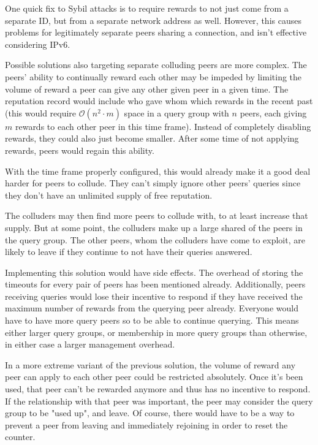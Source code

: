 One quick fix to Sybil attacks is to require rewards to not just come from a
separate ID, but from a separate network address as well. However, this causes
problems for legitimately separate peers sharing a connection, and isn't
effective considering IPv6.

Possible solutions also targeting separate colluding peers are more complex. The
peers' ability to continually reward each other may be impeded by limiting the
volume of reward a peer can give any other given peer in a given time. The
reputation record would include who gave whom which rewards in the recent past
(this would require $\mathcal{O}(n^2 \cdot m)$ space in a query group with $n$
peers, each giving $m$ rewards to each other peer in this time frame). Instead
of completely disabling rewards, they could also just become smaller. After some
time of not applying rewards, peers would regain this ability.

With the time frame properly configured, this would already make it a good deal
harder for peers to collude. They can't simply ignore other peers' queries since
they don't have an unlimited supply of free reputation.

The colluders may then find more peers to collude with, to at least increase
that supply. But at some point, the colluders make up a large shared of the
peers in the query group. The other peers, whom the colluders have come to
exploit, are likely to leave if they continue to not have their queries
answered.

Implementing this solution would have side effects. The overhead of storing the
timeouts for every pair of peers has been mentioned already. Additionally, peers
receiving queries would lose their incentive to respond if they have received
the maximum number of rewards from the querying peer already. Everyone would
have to have more query peers so to be able to continue querying. This means
either larger query groups, or membership in more query groups than otherwise,
in either case a larger management overhead.

In a more extreme variant of the previous solution, the volume of reward any
peer can apply to each other peer could be restricted absolutely. Once it's been
used, that peer can't be rewarded anymore and thus has no incentive to respond.
If the relationship with that peer was important, the peer may consider the
query group to be "used up", and leave. Of course, there would have to be a way
to prevent a peer from leaving and immediately rejoining in order to reset the
counter.

